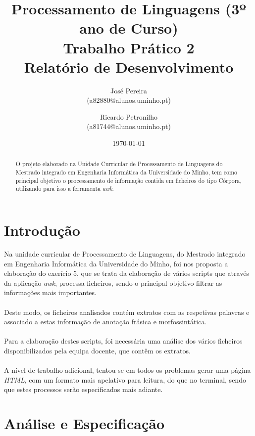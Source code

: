 \documentclass[11pt,a4paper]{report}%
\title{Processamento de Linguagens (3º ano de Curso)\\
       \textbf{Trabalho Prático 2}\\ Relatório de Desenvolvimento
       } %
\author{José Pereira\\ (a82880@alunos.uminho.pt) \and Ricardo Petronilho\\ (a81744@alunos.uminho.pt)
       } %
\date{\today} %
\begin{document}
\maketitle %

\begin{abstract}  %
O projeto elaborado na Unidade Curricular de Processamento de Linguagens do Mestrado integrado em Engenharia Informática da Universidade do Minho, tem como principal objetivo o processamento de informação contida em ficheiros do tipo Córpora, utilizando para isso a ferramenta \emph{awk}.
\end{abstract}

\tableofcontents %

\chapter{Introdução} \label{chap:intro} %

Na unidade curricular de Processamento de Linguagens, do Mestrado integrado em Engenharia Informática da Universidade do Minho, foi nos proposta a elaboração do exerício 5, que se trata da elaboração de vários scripts que através da aplicação \emph{awk}, processa ficheiros, sendo o principal objetivo filtrar as informações mais importantes.\\\\
Deste modo, os ficheiros analisados contém extratos com as respetivas palavras e associado a estas informação de anotação frásica e morfossintática.\\\\Para a elaboração destes scripts, foi necessária uma análise dos vários ficheiros disponibilizados pela equipa docente, que contêm os extratos. 
\\\\A nível de trabalho adicional, tentou-se em todos os problemas gerar uma página \emph{HTML}, com um formato mais apelativo para leitura, do que no terminal, sendo que estes processos serão especificados mais adiante.


\chapter{Análise e Especificação} \label{chap:analiseEspecificacao} %
\end{document}
